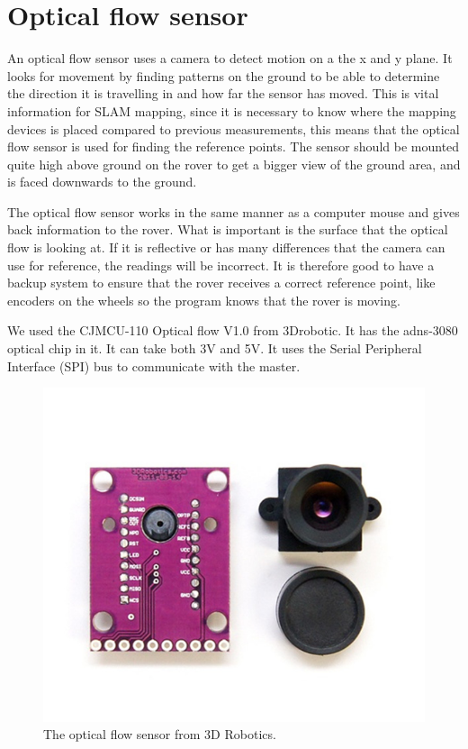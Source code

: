\clearpage
\section{Optical flow sensor}

An optical flow sensor uses a camera to detect motion on a the x and y plane. It looks for movement by finding patterns on the ground to be able to determine the direction it is travelling in and how far the sensor has moved. This is vital information for SLAM mapping, since it is necessary to know where the mapping devices is placed compared to previous measurements, this means that the optical flow sensor is used for finding the reference points. The sensor should be mounted quite high above ground on the rover to get a bigger view of the ground area, and is faced downwards to the ground\cite{opti_using}.


The optical flow sensor works in the same manner as a computer mouse and gives back information to the rover. What is important is the surface that the optical flow is looking at. If it is reflective or has many differences that the camera can use for reference, the readings will be incorrect. It is therefore good to have a backup system to ensure that the rover receives a correct reference point, like encoders on the wheels so the program knows that the rover is moving.

We used the CJMCU-110 Optical flow V1.0 from 3Drobotic. It has the adns-3080 optical chip in it. It can take both 3V and 5V. It uses the Serial Peripheral Interface (SPI) bus to communicate with the master.\cite{opti_datasheet}

\begin{figure}[H]
	\centering
	\includegraphics[width=.3\linewidth]{images/optical.jpg}
	\caption{The optical flow sensor from 3D Robotics.}
\end{figure}